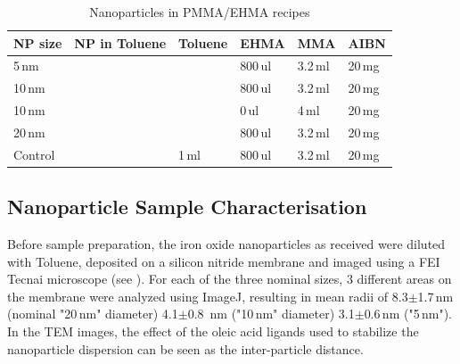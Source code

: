 \begin{table}[tp]
	\centering
	\caption{Nanoparticles in PMMA/EHMA recipes}
	\label{tab:sampleCP}
	\begin{tabular}{llllll}
		\hline
		NP size &NP in Toluene&Toluene & EHMA & MMA & AIBN \\
		\hline
		5\,nm& & &800\,ul&  3.2\,ml&   20\,mg    \\
		10\,nm& & &800\,ul&  3.2\,ml&   20\,mg    \\
		10\,nm& & &0\,ul&  4\,ml&   20\,mg    \\
		20\,nm& & &800\,ul&  3.2\,ml&   20\,mg    \\
			Control& & 1\,ml&800\,ul&  3.2\,ml&   20\,mg    \\
		\hline
	\end{tabular}
\end{table}

\subsection{Nanoparticle Sample Characterisation}
Before sample preparation, the iron oxide nanoparticles as received were diluted with Toluene, deposited on a silicon nitride membrane and imaged using a FEI Tecnai microscope  (see ).  For each of the three nominal sizes, 3 different areas on the membrane were analyzed using ImageJ, resulting in mean radii of 8.3$\pm$1.7\,nm (nominal "20\,nm" diameter) 4.1$\pm$0.8 \,nm	("10\,nm" diameter) 3.1$\pm$0.6\,nm ("5\,nm"). In the TEM images, the effect of the oleic acid ligands used to stabilize the nanoparticle dispersion  can be seen as the inter-particle distance.

